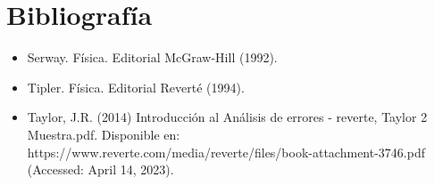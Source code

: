 \documentclass[10pt]{article}
\begin{document}

\section{Bibliografía}
\begin{itemize}
	\item  Serway. F\'isica. Editorial McGraw-Hill (1992).\\
	\item Tipler. Física. Editorial Revert\'e (1994). \\
	\item Taylor, J.R. (2014) Introducci\'on al Análisis de errores - reverte, Taylor 2 Muestra.pdf. Disponible en: https://www.reverte.com/media/reverte/files/book-attachment-3746.pdf (Accessed: April 14, 2023).
\end{itemize}
\end{document}
